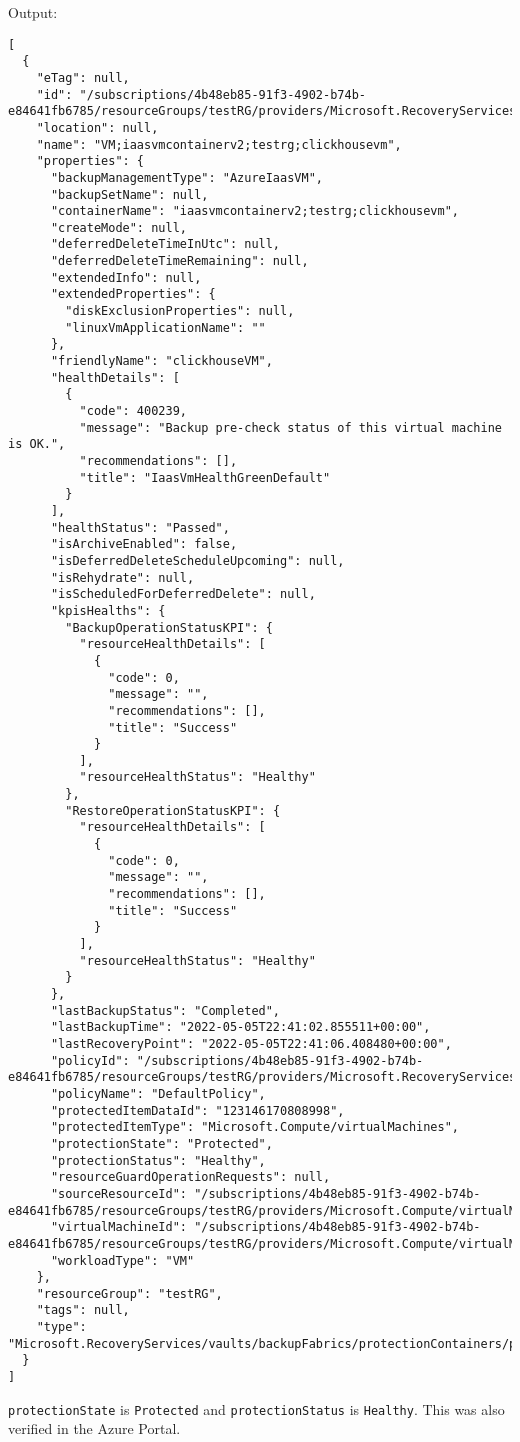 Output:
\begin{verbatim}
[
  {
    "eTag": null,
    "id": "/subscriptions/4b48eb85-91f3-4902-b74b-e84641fb6785/resourceGroups/testRG/providers/Microsoft.RecoveryServices/vaults/myRSV/backupFabrics/Azure/protectionContainers/IaasVMContainer;iaasvmcontainerv2;testrg;clickhousevm/protectedItems/VM;iaasvmcontainerv2;testrg;clickhousevm",
    "location": null,
    "name": "VM;iaasvmcontainerv2;testrg;clickhousevm",
    "properties": {
      "backupManagementType": "AzureIaasVM",
      "backupSetName": null,
      "containerName": "iaasvmcontainerv2;testrg;clickhousevm",
      "createMode": null,
      "deferredDeleteTimeInUtc": null,
      "deferredDeleteTimeRemaining": null,
      "extendedInfo": null,
      "extendedProperties": {
        "diskExclusionProperties": null,
        "linuxVmApplicationName": ""
      },
      "friendlyName": "clickhouseVM",
      "healthDetails": [
        {
          "code": 400239,
          "message": "Backup pre-check status of this virtual machine is OK.",
          "recommendations": [],
          "title": "IaasVmHealthGreenDefault"
        }
      ],
      "healthStatus": "Passed",
      "isArchiveEnabled": false,
      "isDeferredDeleteScheduleUpcoming": null,
      "isRehydrate": null,
      "isScheduledForDeferredDelete": null,
      "kpisHealths": {
        "BackupOperationStatusKPI": {
          "resourceHealthDetails": [
            {
              "code": 0,
              "message": "",
              "recommendations": [],
              "title": "Success"
            }
          ],
          "resourceHealthStatus": "Healthy"
        },
        "RestoreOperationStatusKPI": {
          "resourceHealthDetails": [
            {
              "code": 0,
              "message": "",
              "recommendations": [],
              "title": "Success"
            }
          ],
          "resourceHealthStatus": "Healthy"
        }
      },
      "lastBackupStatus": "Completed",
      "lastBackupTime": "2022-05-05T22:41:02.855511+00:00",
      "lastRecoveryPoint": "2022-05-05T22:41:06.408480+00:00",
      "policyId": "/subscriptions/4b48eb85-91f3-4902-b74b-e84641fb6785/resourceGroups/testRG/providers/Microsoft.RecoveryServices/vaults/myRSV/backupPolicies/DefaultPolicy",
      "policyName": "DefaultPolicy",
      "protectedItemDataId": "123146170808998",
      "protectedItemType": "Microsoft.Compute/virtualMachines",
      "protectionState": "Protected",
      "protectionStatus": "Healthy",
      "resourceGuardOperationRequests": null,
      "sourceResourceId": "/subscriptions/4b48eb85-91f3-4902-b74b-e84641fb6785/resourceGroups/testRG/providers/Microsoft.Compute/virtualMachines/clickhouseVM",
      "virtualMachineId": "/subscriptions/4b48eb85-91f3-4902-b74b-e84641fb6785/resourceGroups/testRG/providers/Microsoft.Compute/virtualMachines/clickhouseVM",
      "workloadType": "VM"
    },
    "resourceGroup": "testRG",
    "tags": null,
    "type": "Microsoft.RecoveryServices/vaults/backupFabrics/protectionContainers/protectedItems"
  }
]
\end{verbatim}

\texttt{protectionState} is \texttt{Protected} and \texttt{protectionStatus} is \texttt{Healthy}.
This was also verified in the Azure Portal.
